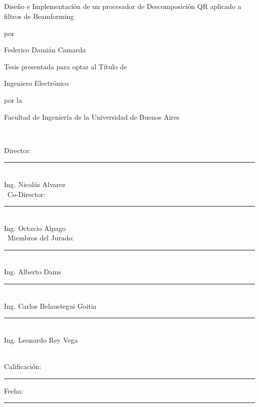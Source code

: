 \enlargethispage{2cm}
\thispagestyle{carat}

\

\

\

\

\begin{center}

\Large{Diseño e Implementación de un procesador de Descomposición QR aplicado a filtros de Beamforming}

\vspace{0.4cm}

\normalsize{por}

\vspace{0.4cm}

\Large{Federico Damián Camarda}

\vspace{0.4cm}

\normalsize{Tesis presentada para optar al Título de}

\vspace{0.4cm}

\large{Ingeniero Electrónico}

\vspace{0.4cm}

\normalsize{por la}

\vspace{0.4cm}

\large{Facultad de Ingeniería de la Universidad de Buenos Aires}

\

\end{center}

Director:\\
\hspace*{5.5cm} \rule{7cm}{0.5pt} \\
\hspace*{7cm} Ing. Nicolás Alvarez \\
\
Co-Director:\\
\hspace*{5.5cm} \rule{7cm}{0.5pt} \\
\hspace*{7cm} Ing. Octavio Alpago \\
\
Miembros del Jurado:\\
\hspace*{5.5cm} \rule{7cm}{0.5pt} \\
\hspace*{7cm} Ing. Alberto Dams \\

\hspace*{5.5cm} \rule{7cm}{0.5pt} \\
\hspace*{7cm} Ing. Carlos Belaustegui Goitia \\

\hspace*{5.5cm} \rule{7cm}{0.5pt} \\
\hspace*{7cm} Ing. Leonardo Rey Vega \\

\

\begin{center}
Calificación: \rule{4cm}{0.5pt} \hspace{1cm} Fecha: \rule{4cm}{0.5pt}\\
\end{center}

